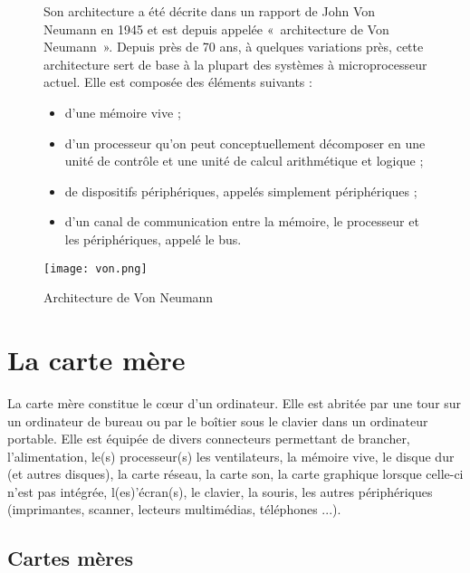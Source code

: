 \begin{figure}[h]
\begin{minipage}[c]{.49\linewidth}

Son architecture a été décrite dans un rapport de John Von Neumann en 1945 et
est depuis appelée «~architecture de Von Neumann~». Depuis près de 70 ans, à quelques variations
près, cette  architecture sert de base à la plupart des systèmes à microprocesseur actuel. Elle est composée des éléments suivants :
\begin{itemize}
\item d'une mémoire vive ;
\item d'un processeur qu'on peut conceptuellement décomposer en une unité de contrôle et
une unité de calcul arithmétique et logique ;
\item de dispositifs périphériques, appelés simplement périphériques ;
\item d'un canal de communication entre la mémoire, le processeur et les périphériques, appelé
le bus.
\end{itemize}

\end{minipage} \hfill
\begin{minipage}[c]{.49\linewidth}
\begin{center}
\texttt{[image: von.png]}
\caption{Architecture de Von Neumann}
\label{}
\end{center}
\end{minipage}
\end{figure}




\section{La carte mère}
La carte mère constitue le c\oe{}ur d'un ordinateur. Elle est abritée par une tour sur un ordinateur de bureau ou par le boîtier sous le clavier dans un ordinateur portable. Elle est équipée de divers connecteurs permettant de brancher, l'alimentation, le(s) processeur(s)
les ventilateurs, 
la mémoire vive, 
le disque dur (et autres disques), 
la carte réseau, 
la carte son, 
la carte graphique lorsque celle-ci n'est pas intégrée, 
l(es)'écran(s), 
le clavier,  
la souris, 
les autres périphériques (imprimantes, scanner, lecteurs multimédias, téléphones ...).



\subsection{Cartes mères}

